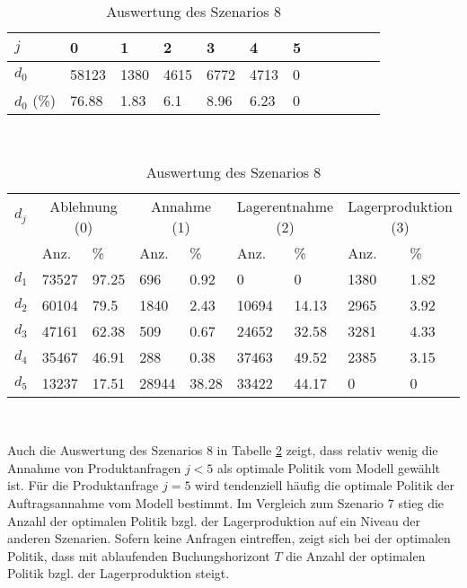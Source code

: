 \begin{table}[h!]
\renewcommand{\arraystretch}{1.5}
  \begin{center}
    \caption{Auswertung des Szenarios 8}  \label{AS8}
    \vspace*{3mm}
    \begin{tabular}{l l l l l l l l l l l l }  \hline 
         $j$ & 0 & 1  & 2 & 3 & 4  & 5   \\  \hline
$d_{0}$ &  58123 &  1380 &  4615 &  6772 &  4713 &  0 \\
$d_{0}$ (\%) &  76.88 &  1.83 &   6.1 &  8.96 &  6.23 &  0 \\
\hline
    \end{tabular} \\[3mm]
        \begin{tabular}{ l l l l l l l l l}   \hline    %
    $d_j$ & \multicolumn{2}{c}{Ablehnung (0)} & \multicolumn{2}{c}{Annahme (1)}  & \multicolumn{2}{c}{Lagerentnahme (2)} & \multicolumn{2}{c}{Lagerproduktion (3)}\\
    & Anz. & \% & Anz. & \% & Anz. & \% & Anz. & \% \\ \hline 
$d_{1}$ &  73527 &  97.25 &    696 &   0.92 &    0 &    0 &  1380 &  1.82 \\
$d_{2}$ &  60104 &   79.5 &   1840 &   2.43 &  10694 &  14.13 &  2965 &  3.92 \\
$d_{3}$ &  47161 &  62.38 &    509 &   0.67 &  24652 &  32.58 &  3281 &  4.33 \\
$d_{4}$ &  35467 &  46.91 &    288 &   0.38 &  37463 &  49.52 &  2385 &  3.15 \\
$d_{5}$ &  13237 &  17.51 &  28944 &  38.28 &  33422 &  44.17 &   0 &   0 \\
          \hline
   \end{tabular} \\[3mm]
     \end{center}
\end{table}

Auch die Auswertung des Szenarios 8 in Tabelle \ref{AS8} zeigt, dass relativ wenig die Annahme von Produktanfragen $j<5$ als optimale Politik vom Modell gewählt ist. Für die Produktanfrage $j=5$ wird tendenziell häufig die optimale Politik der Auftragsannahme vom Modell bestimmt. Im Vergleich zum Szenario 7 stieg die Anzahl der optimalen Politik bzgl. der Lagerproduktion auf ein Niveau der anderen Szenarien. Sofern keine Anfragen eintreffen, zeigt sich bei der optimalen Politik, dass mit ablaufenden Buchungshorizont $T$ die Anzahl der optimalen Politik bzgl. der Lagerproduktion steigt.

